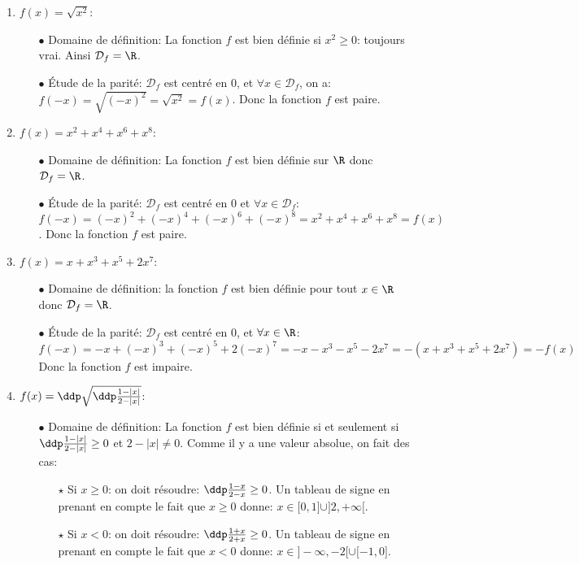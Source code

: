 \begin{correction}  \;
\begin{enumerate}
\item $f(x)=\sqrt{x^2}$: 
\begin{itemize}
\item[$\bullet$] Domaine de d\'efinition: La fonction $f$ est bien d\'efinie si $x^2\geq 0$: toujours vrai. Ainsi $\mathcal{D}_f=\R$. 
\item[$\bullet$] \'Etude de la parit\'e: $\mathcal{D}_f$ est centr\'e en 0, et  $\forall x\in\mathcal{D}_f$, on a: $f(-x)=\sqrt{(-x)^2}=\sqrt{x^2}=f(x)$.
Donc la fonction $f$ est paire.
\end{itemize}
\item $f(x)=x^2+x^4+x^6+x^8$:
\begin{itemize}
\item[$\bullet$] Domaine de d\'efinition: La fonction $f$ est bien d\'efinie sur $\R$ donc $\mathcal{D}_f=\R$.
\item[$\bullet$] \'Etude de la parit\'e:  $\mathcal{D}_f$ est centr\'e en 0 et $\forall x\in\mathcal{D}_f$: $f(-x)=(-x)^2+(-x)^4+(-x)^6+(-x)^8=x^2+x^4+x^6+x^8=f(x)$.
Donc la fonction $f$ est paire.
\end{itemize}
\item $f(x)=x+x^3+x^5+2x^7$:
\begin{itemize}
\item[$\bullet$] Domaine de d\'efinition: la fonction $f$ est bien d\'efinie pour tout $x\in\R$ donc $\mathcal{D}_f=\R$.
\item[$\bullet$] \'Etude de la parit\'e: $\mathcal{D}_f$ est centr\'e en 0, et $\forall x\in\R$: $f(-x)=-x+(-x)^3+(-x)^5+2(-x)^7=-x-x^3-x^5-2x^7=-(x+x^3+x^5+2x^7)=-f(x)$
Donc la fonction $f$ est impaire.
\end{itemize}
\item $f(x)=\ddp\sqrt{\ddp\frac{1-|x|}{2-|x|}}$:
\begin{itemize}
\item[$\bullet$] Domaine de d\'efinition: La fonction $f$ est bien d\'efinie si et seulement si $\ddp\frac{1-|x|}{2-|x|}\geq 0$ et $2-|x|\not= 0$. Comme il y a une valeur absolue, on fait des cas:
\begin{itemize}
\item[$\star$] Si $x\geq 0$: on doit r\'esoudre: $\ddp\frac{1-x}{2-x}\geq 0$. Un tableau de signe en prenant en compte le fait que $x\geq 0$ donne: $x\in\lbrack 0,1\rbrack\cup\rbrack 2,+\infty\lbrack$.
\item[$\star$] Si $x<0$: on doit r\'esoudre: $\ddp\frac{1+x}{2+x}\geq 0$. Un tableau de signe en prenant en compte le fait que $x< 0$ donne: $x\in\rbrack -\infty,-2\lbrack\cup\lbrack -1,0\rbrack$.

\end{itemize}
\end{itemize}
\end{enumerate}
\end{correction}
